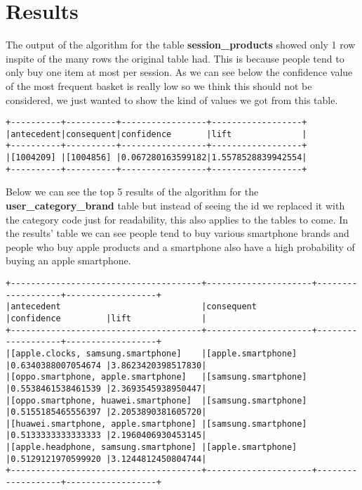 \section{Results}
\label{conclusions}

The output of the algorithm for the table \textbf{session\_products} showed only 1 row inspite of the many rows the original table had. This is because people tend to only buy one item at most per session.
As we can see below the confidence value of the most frequent basket is really low so we think this should not be considered, we just wanted to show the kind of values
we got from this table.

\begin{Verbatim}[commandchars=\\\{\}]
+----------+----------+-----------------+------------------+
|antecedent|consequent|confidence       |lift              |
+----------+----------+-----------------+------------------+
|[1004209] |[1004856] |0.067280163599182|1.5578528839942554|
+----------+----------+-----------------+------------------+
\end{Verbatim}

Below we can see the top 5 results of the algorithm for the \textbf{user\_category\_brand} table but instead of seeing the id we replaced it with the category code just for readability, this also applies to the tables to come.
In the results' table we can see people tend to buy various smartphone brands and people who buy apple products and a smartphone also have a high probability of buying
an apple smartphone.

\begin{Verbatim}[commandchars=\\\{\}]
+--------------------------------------+---------------------+-------------------+------------------+
|antecedent                            |consequent           |confidence         |lift              |
+--------------------------------------+---------------------+-------------------+------------------+
|[apple.clocks, samsung.smartphone]    |[apple.smartphone]   |0.6340388007054674 |3.8623420398517830|
|[oppo.smartphone, apple.smartphone]   |[samsung.smartphone] |0.5538461538461539 |2.3693545938950447|
|[oppo.smartphone, huawei.smartphone]  |[samsung.smartphone] |0.5155185465556397 |2.2053890381605720|
|[huawei.smartphone, apple.smartphone] |[samsung.smartphone] |0.5133333333333333 |2.1960406930453145|
|[apple.headphone, samsung.smartphone] |[apple.smartphone]   |0.5129121970599920 |3.1244812450804744|
+--------------------------------------+---------------------+-------------------+------------------+
\end{Verbatim}

